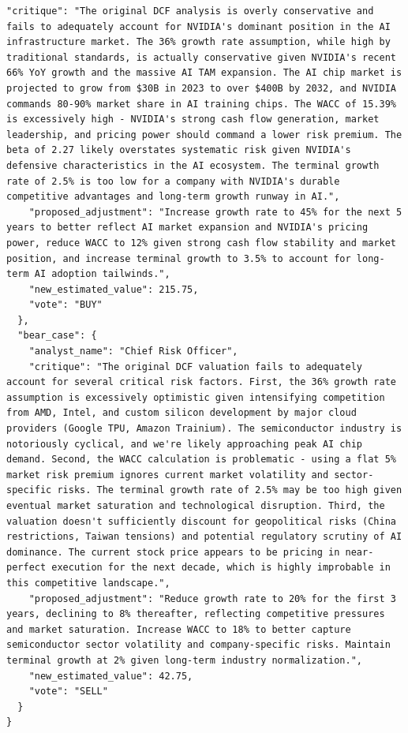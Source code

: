 \documentclass{article}
\begin{document}
\begin{lstlisting}[caption={Complete Valuation Results (valuation\_results.json)}, label={lst:valuation_results}, basicstyle=\ttfamily\tiny, breaklines=true]
    "critique": "The original DCF analysis is overly conservative and fails to adequately account for NVIDIA's dominant position in the AI infrastructure market. The 36% growth rate assumption, while high by traditional standards, is actually conservative given NVIDIA's recent 66% YoY growth and the massive AI TAM expansion. The AI chip market is projected to grow from $30B in 2023 to over $400B by 2032, and NVIDIA commands 80-90% market share in AI training chips. The WACC of 15.39% is excessively high - NVIDIA's strong cash flow generation, market leadership, and pricing power should command a lower risk premium. The beta of 2.27 likely overstates systematic risk given NVIDIA's defensive characteristics in the AI ecosystem. The terminal growth rate of 2.5% is too low for a company with NVIDIA's durable competitive advantages and long-term growth runway in AI.",
    "proposed_adjustment": "Increase growth rate to 45% for the next 5 years to better reflect AI market expansion and NVIDIA's pricing power, reduce WACC to 12% given strong cash flow stability and market position, and increase terminal growth to 3.5% to account for long-term AI adoption tailwinds.",
    "new_estimated_value": 215.75,
    "vote": "BUY"
  },
  "bear_case": {
    "analyst_name": "Chief Risk Officer",
    "critique": "The original DCF valuation fails to adequately account for several critical risk factors. First, the 36% growth rate assumption is excessively optimistic given intensifying competition from AMD, Intel, and custom silicon development by major cloud providers (Google TPU, Amazon Trainium). The semiconductor industry is notoriously cyclical, and we're likely approaching peak AI chip demand. Second, the WACC calculation is problematic - using a flat 5% market risk premium ignores current market volatility and sector-specific risks. The terminal growth rate of 2.5% may be too high given eventual market saturation and technological disruption. Third, the valuation doesn't sufficiently discount for geopolitical risks (China restrictions, Taiwan tensions) and potential regulatory scrutiny of AI dominance. The current stock price appears to be pricing in near-perfect execution for the next decade, which is highly improbable in this competitive landscape.",
    "proposed_adjustment": "Reduce growth rate to 20% for the first 3 years, declining to 8% thereafter, reflecting competitive pressures and market saturation. Increase WACC to 18% to better capture semiconductor sector volatility and company-specific risks. Maintain terminal growth at 2% given long-term industry normalization.",
    "new_estimated_value": 42.75,
    "vote": "SELL"
  }
}
\end{lstlisting}
\end{document}
